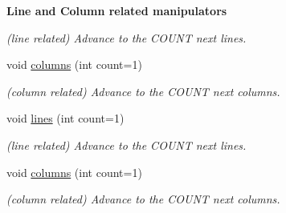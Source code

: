 \begin{Indent}{\bf Line and Column related manipulators}
\begin{DoxyCompactItemize}
\begin{DoxyCompactList}\small\item\em (line related) Advance to the C\-O\-U\-N\-T next lines. \end{DoxyCompactList}\item 
\hypertarget{classyy_1_1position_ab15e0388c4fd433aa19c2435e49f72e9}{void \hyperlink{classyy_1_1position_ab15e0388c4fd433aa19c2435e49f72e9}{columns} (int count=1)}\label{classyy_1_1position_ab15e0388c4fd433aa19c2435e49f72e9}

\begin{DoxyCompactList}\small\item\em (column related) Advance to the C\-O\-U\-N\-T next columns. \end{DoxyCompactList}\item 
\hypertarget{classyy_1_1position_a4fbdd03b4e09fa8755d79d3e675d6d3a}{void \hyperlink{classyy_1_1position_a4fbdd03b4e09fa8755d79d3e675d6d3a}{lines} (int count=1)}\label{classyy_1_1position_a4fbdd03b4e09fa8755d79d3e675d6d3a}

\begin{DoxyCompactList}\small\item\em (line related) Advance to the C\-O\-U\-N\-T next lines. \end{DoxyCompactList}\item 
\hypertarget{classyy_1_1position_ab15e0388c4fd433aa19c2435e49f72e9}{void \hyperlink{classyy_1_1position_ab15e0388c4fd433aa19c2435e49f72e9}{columns} (int count=1)}\label{classyy_1_1position_ab15e0388c4fd433aa19c2435e49f72e9}

\begin{DoxyCompactList}\small\item\em (column related) Advance to the C\-O\-U\-N\-T next columns. \end{DoxyCompactList}\end{DoxyCompactItemize}
\end{Indent}
